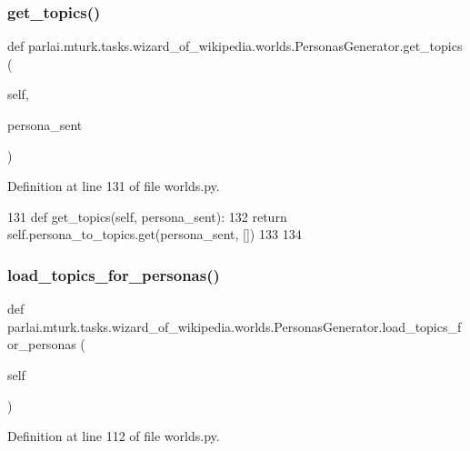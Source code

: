 \subsubsection{\texorpdfstring{get\+\_\+topics()}{get\_topics()}}
{\footnotesize\ttfamily def parlai.\+mturk.\+tasks.\+wizard\+\_\+of\+\_\+wikipedia.\+worlds.\+Personas\+Generator.\+get\+\_\+topics (\begin{DoxyParamCaption}\item[{}]{self,  }\item[{}]{persona\+\_\+sent }\end{DoxyParamCaption})}



Definition at line 131 of file worlds.\+py.


\begin{DoxyCode}
131     \textcolor{keyword}{def }get\_topics(self, persona\_sent):
132         \textcolor{keywordflow}{return} self.persona\_to\_topics.get(persona\_sent, [])
133 
134 
\end{DoxyCode}
\mbox{\label{classparlai_1_1mturk_1_1tasks_1_1wizard__of__wikipedia_1_1worlds_1_1PersonasGenerator_a3fcb297679661fe3955ea3aa416f32c4}} 
\subsubsection{\texorpdfstring{load\+\_\+topics\+\_\+for\+\_\+personas()}{load\_topics\_for\_personas()}}
{\footnotesize\ttfamily def parlai.\+mturk.\+tasks.\+wizard\+\_\+of\+\_\+wikipedia.\+worlds.\+Personas\+Generator.\+load\+\_\+topics\+\_\+for\+\_\+personas (\begin{DoxyParamCaption}\item[{}]{self }\end{DoxyParamCaption})}



Definition at line 112 of file worlds.\+py.


